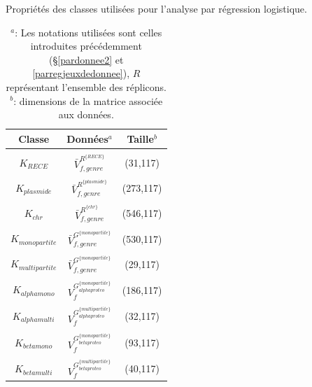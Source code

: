 \begin{table}

	\begin{center}
	\caption[Propriétés des classes utilisées pour l'analyse de régression logistique]{Propriétés des classes utilisées pour l'analyse par régression logistique.}\label{tabclassecaracter}
 	\begin{tabular}{ccc}
	\textbf{Classe} & \textbf{Données$^{a}$} & \textbf{Taille$^{b}$} \\
	\hline
	 & &  \\[-0.2cm]
	$K_{RECE}$ & $\bar{V}^{R^{\{RECE\}}}_{f,genre}$ & (31,117) \\
	 & &  \\[-0.2cm]
	$K_{plasmide}$ & $ \bar{V}^{R^{\{plasmide\}}}_{f,genre}$ & (273,117) \\
	 & &  \\[-0.2cm]
	$K_{chr}$ & $\bar{V}^{R^{\{chr\}}}_{f,genre}$ & (546,117) \\
	 & &  \\[-0.2cm]
	$K_{monopartite}$ & $\bar{V}^{G^{\{monopartite\}}}_{f,genre}$ & (530,117) \\
	 & &  \\[-0.2cm]
	$K_{multipartite}$ & $\bar{V}^{G^{\{monopartite\}}}_{f,genre}$ & (29,117) \\
	 & &  \\[-0.2cm]
	$K_{alphamono}$ & $V^{G_{alphaproteo}^{\{monopartite\}}}_{f}$ & (186,117) \\
	 & &  \\[-0.2cm]
	$K_{alphamulti}$ & $V^{G_{alphaproteo}^{\{multipartite\}}}_{f}$ & (32,117) \\
	 & &  \\[-0.2cm]
	$K_{betamono}$ & $V^{G_{betaproteo}^{\{monopartite\}}}_{f}$ & (93,117) \\
	 & &  \\[-0.2cm]
	$K_{betamulti}$ & $V^{G_{betaproteo}^{\{multipartite\}}}_{f}$ & (40,117) \\
	\end{tabular}
	\medskip
	\captionsetup{justification = justified}	
	\caption*{$^{a}$: Les notations utilisées sont celles introduites précédemment (\S \ref{pardonnee2} et \ref{parregjeuxdedonnee}), $R$ représentant l'ensemble des réplicons. \\ $^{b}$: dimensions de la matrice associée aux données.}
	\captionsetup{}
	\end{center}
\end{table}

